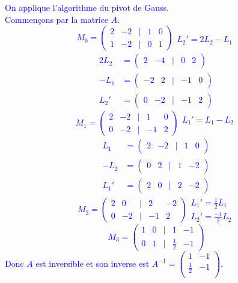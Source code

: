 \documentclass[a4paper,12pt]{article}
\begin{document}
\textcolor{blue}{ On applique l'algorithme du pivot de Gauss. \\
Commençons par la matrice $A$.
\[ M_0=
\begin{pmatrix}
\boxed{2} & -2 & | & 1 & 0 \\
1 & -2 & | & 0 & 1
\end{pmatrix} 
\begin{array}{c} \\
L_2' = 2L_2 - L_1
\end{array}
\]
\[
\begin{aligned}
2L_2 &= \begin{pmatrix}
2 & -4 & | & 0 & 2
\end{pmatrix} \\
-L_1 &= \begin{pmatrix}
-2 & 2 & | & -1 & 0
\end{pmatrix} \\
L_2' &= \begin{pmatrix}
0 & -2 & | & -1 & 2
\end{pmatrix}
\end{aligned}
\]
\[ M_1=
\begin{pmatrix}
2 & -2 & | & 1 & 0 \\
0 & \boxed{-2} & | & -1 & 2
\end{pmatrix} 
\begin{array}{c} L_1' = L_1-L_2 
\\
\\
\end{array}
\]
\[
\begin{aligned}
L_1 &= \begin{pmatrix}
2 & -2 & | & 1 & 0 
\end{pmatrix} \\
-L_2 &= \begin{pmatrix}
0 & 2 & | & 1 & -2
\end{pmatrix} \\
L_1' &= \begin{pmatrix}
2 & 0 & | & 2 & -2 
\end{pmatrix}
\end{aligned}
\]
\[ M_2=
\begin{pmatrix}
2 & 0 & | & 2 & -2  \\
0 & -2 & | & -1 & 2
\end{pmatrix} 
\begin{array}{c} L_1' = \frac{1}{2} L_1 \\
L_2'= \frac{-1}{2} L_2
\end{array}
\]
\[ M_3=
\begin{pmatrix}
1 & 0 & | & 1 & -1  \\
0 & 1 & | & \frac{1}{2} & -1
\end{pmatrix}
\]
Donc $A$ est inversible et son inverse est \( A^{-1} = \begin{pmatrix}
1 & -1 \\
\frac{1}{2} & -1 \\
\end{pmatrix} \).
}
\end{document}
